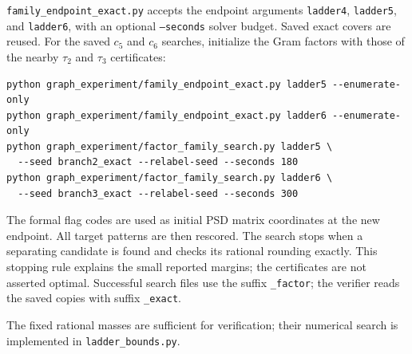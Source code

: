 \documentclass[11pt]{article}
\begin{document}
\texttt{family\_endpoint\_exact.py} accepts the endpoint arguments
\texttt{ladder4}, \texttt{ladder5}, and \texttt{ladder6}, with an optional
\texttt{--seconds} solver budget. Saved exact covers are reused.
For the saved $c_5$ and $c_6$ searches, initialize the Gram factors with
those of the nearby $\tau_2$ and $\tau_3$ certificates:
\begin{verbatim}
python graph_experiment/family_endpoint_exact.py ladder5 --enumerate-only
python graph_experiment/family_endpoint_exact.py ladder6 --enumerate-only
python graph_experiment/factor_family_search.py ladder5 \
  --seed branch2_exact --relabel-seed --seconds 180
python graph_experiment/factor_family_search.py ladder6 \
  --seed branch3_exact --relabel-seed --seconds 300
\end{verbatim}
The formal flag codes are used as initial PSD matrix coordinates at the
new endpoint. All target patterns are then rescored. The search stops
when a separating candidate is found and checks its rational rounding
exactly. This stopping rule explains the small reported margins; the
certificates are not asserted optimal. Successful search files use the
suffix \texttt{\_factor}; the verifier reads the saved copies with suffix
\texttt{\_exact}.

The fixed rational masses are sufficient for verification; their numerical
search is implemented in \texttt{ladder\_bounds.py}.
\end{document}
